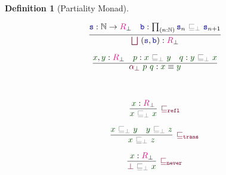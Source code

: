 \documentclass[twoside,11pt,openright]{report}
\theoremstyle{plain} %
\theoremstyle{definition}
\newtheorem{defn}{Definition}[section]
\theoremstyle{remark}
\newcommand*{\term}[1]{\textcolor{green!30!black}{#1}} %
\newcommand*{\type}[1]{\textcolor{magenta!90!black}{#1}}
\newcommand*{\relation}[1]{\textcolor{gray}{\ensuremath{\mathtt{#1}}}}
\newcommand*{\function}[1]{\textcolor{blue!60!black}{\ensuremath{\mathtt{#1}}}}
\newcommand*{\constructor}[1]{\textcolor{purple!60!black}{\ensuremath{\mathtt{#1}}}}
\begin{document}
\begin{defn}[Partiality Monad]
\begin{center}
\begin{minipage}{0.45\linewidth}
      \begin{equation}
        \infer{\constructor{\bigsqcup}~(\function{s},\function{b}) : \type{R}_\bot}{\function{s} : \mathbb{N} \rightarrow \type{R}_\bot & \function{b} : \prod_{(n : \mathbb{N})} \function{s}_n~\relation{\sqsubseteq_{\bot}}~\function{s}_{n+1} }
      \end{equation}
    \end{minipage}
    \hfill
    \begin{minipage}{0.45\linewidth}
      \begin{equation}
        \infer{\constructor{\alpha_{\bot}}~\term{p}~\term{q} : \term{x} \equiv \term{y}}{\term{x},\term{y} : \type{R}_\bot & \term{p} : \term{x}~\relation{\sqsubseteq_{\bot}}~\term{y} & \term{q} : \term{y}~\relation{\sqsubseteq_{\bot}}~\term{x}}
      \end{equation}
    \end{minipage}
  \end{center}
  \strut\\[-15mm]
  \begin{center}
    \begin{minipage}{0.25\linewidth}
      \begin{equation}
        \infer[\constructor{\sqsubseteq_{refl}}]{\term{x}~\relation{\sqsubseteq_{\bot}}~\term{x}}{\term{x} : \type{R}_\bot}
      \end{equation}
    \end{minipage}
    \hfill
    \begin{minipage}{0.35\linewidth}
      \begin{equation}
        \infer[\constructor{\sqsubseteq_{trans}}]{\term{x}~\relation{\sqsubseteq_{\bot}}~\term{z}}{\term{x}~\relation{\sqsubseteq_{\bot}}~\term{y} & \term{y}~\relation{\sqsubseteq_{\bot}}~\term{z}}
      \end{equation}
    \end{minipage}
    \hfill
    \begin{minipage}{0.25\linewidth}
      \begin{equation}
        \infer[\constructor{\sqsubseteq_{never}}]{\constructor{\bot}~\relation{\sqsubseteq_{\bot}}~\term{x}}{\term{x} : \type{R}_\bot}
      \end{equation}
    \end{minipage}
  \end{center}
  \strut\\[-15mm]
  \begin{center}
    \hfill
    \begin{minipage}{0.50\linewidth}

\end{minipage}
\end{center}
\end{defn}
\end{document}
